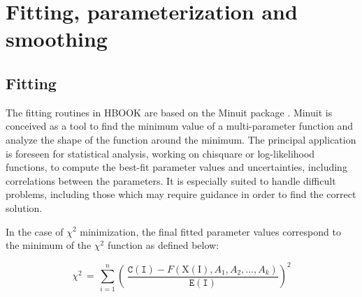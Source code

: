  
\chapter{Fitting, parameterization and smoothing}
\label{HFITPASM}

\section{Fitting}
\label{HFitting}
 
The fitting routines in HBOOK are based 
on the Minuit package \cite{bib-MINUIT}.
Minuit is conceived as a tool to find the minimum
value of a
multi-parameter function and analyze the shape of the function
around the minimum. The principal application is foreseen for
statistical analysis, working on chisquare or
log-likelihood functions,
to compute the best-fit parameter values and uncertainties,
including correlations between the parameters.
It is especially suited to handle difficult problems, including those
which may require guidance in order to find the correct solution.

In the case of \(\chi^2\) minimization, 
the final fitted parameter values correspond to
the minimum of the \(\chi^2\) function as defined below:
 
\begin{displaymath}
\chi^{2}\, =\, \sum_{i=1}^{n}
                \left(\,
                   \frac{\displaystyle\mathtt{C(I)}
                         -F(\mathrm{X(I)},A_1,A_2,...,A_k)}
                        {\displaystyle\mathtt{E(I)}}
                \right)^{2}
\end{displaymath}
 
